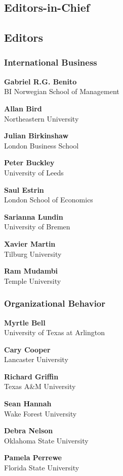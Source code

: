 
\begin{editorialboard}

\subsection{Editors-in-Chief}

\begin{multicols}{2}\raggedright
{}
\end{multicols}

\subsection{Editors}
\begin{multicols}{3}\raggedright \raggedcolumns
\renewcommand\journaleditor[2]{\par\textbf{#1}\\#2}%
\subsubsection{\footnotesize International Business}

\journaleditor{Gabriel R.G. Benito}{BI Norwegian School of Management}
\journaleditor{Allan Bird}{Northeastern University}
\journaleditor{Julian Birkinshaw}{London Business School}
\journaleditor{Peter Buckley}{University of Leeds}
\journaleditor{Saul Estrin}{London School of Economics}
\journaleditor{Sarianna Lundin}{University of Bremen}
\journaleditor{Xavier Martin}{Tilburg University} 
\journaleditor{Ram Mudambi}{Temple University}

\columnbreak

\subsubsection{\footnotesize Organizational Behavior}

\journaleditor{Myrtle Bell}{University of Texas at Arlington}
\journaleditor{Cary Cooper}{Lancaster University}
\journaleditor{Richard Griffin}{Texas A\&M University}
\journaleditor{Sean Hannah}{Wake Forest University}
\journaleditor{Debra Nelson}{Oklahoma State University}
\journaleditor{Pamela Perrewe}{Florida State University}


\end{multicols}
\end{editorialboard}
